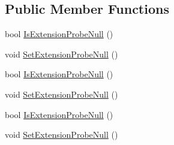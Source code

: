 \subsection*{Public Member Functions}
\begin{DoxyCompactItemize}
\item 
bool \hyperlink{class_env_int_1_1_win32_1_1_field_tech_1_1_manager_1_1_data_sets_1_1_guide_ware_mobile_data_set_1_1_drift_calibration_row_a2abe484cbbc2a67529e9b8be9581eab9}{Is\+Extension\+Probe\+Null} ()
\item 
void \hyperlink{class_env_int_1_1_win32_1_1_field_tech_1_1_manager_1_1_data_sets_1_1_guide_ware_mobile_data_set_1_1_drift_calibration_row_af8c44c0fd399de73a3958dfd411c466c}{Set\+Extension\+Probe\+Null} ()
\item 
bool \hyperlink{class_env_int_1_1_win32_1_1_field_tech_1_1_manager_1_1_data_sets_1_1_guide_ware_mobile_data_set_1_1_drift_calibration_row_a2abe484cbbc2a67529e9b8be9581eab9}{Is\+Extension\+Probe\+Null} ()
\item 
void \hyperlink{class_env_int_1_1_win32_1_1_field_tech_1_1_manager_1_1_data_sets_1_1_guide_ware_mobile_data_set_1_1_drift_calibration_row_af8c44c0fd399de73a3958dfd411c466c}{Set\+Extension\+Probe\+Null} ()
\item 
bool \hyperlink{class_env_int_1_1_win32_1_1_field_tech_1_1_manager_1_1_data_sets_1_1_guide_ware_mobile_data_set_1_1_drift_calibration_row_a2abe484cbbc2a67529e9b8be9581eab9}{Is\+Extension\+Probe\+Null} ()
\item 
void \hyperlink{class_env_int_1_1_win32_1_1_field_tech_1_1_manager_1_1_data_sets_1_1_guide_ware_mobile_data_set_1_1_drift_calibration_row_af8c44c0fd399de73a3958dfd411c466c}{Set\+Extension\+Probe\+Null} ()
\end{DoxyCompactItemize}

